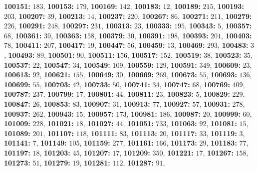 \textsf{\bfseries 100151:} $183$, \textsf{\bfseries 100153:} $179$, \textsf{\bfseries 100169:} $142$, \textsf{\bfseries 100183:} $12$, \textsf{\bfseries 100189:} $215$, \textsf{\bfseries 100193:} $203$, \textsf{\bfseries 100207:} $39$, \textsf{\bfseries 100213:} $14$, \textsf{\bfseries 100237:} $220$, \textsf{\bfseries 100267:} $86$, \textsf{\bfseries 100271:} $211$, \textsf{\bfseries 100279:} $226$, \textsf{\bfseries 100291:} $248$, \textsf{\bfseries 100297:} $231$, \textsf{\bfseries 100313:} $23$, \textsf{\bfseries 100333:} $195$, \textsf{\bfseries 100343:} $5$, \textsf{\bfseries 100357:} $68$, \textsf{\bfseries 100361:} $39$, \textsf{\bfseries 100363:} $158$, \textsf{\bfseries 100379:} $30$, \textsf{\bfseries 100391:} $198$, \textsf{\bfseries 100393:} $201$, \textsf{\bfseries 100403:} $78$, \textsf{\bfseries 100411:} $207$, \textsf{\bfseries 100417:} $19$, \textsf{\bfseries 100447:} $56$, \textsf{\bfseries 100459:} $13$, \textsf{\bfseries 100469:} $293$, \textsf{\bfseries 100483:} $3$, \textsf{\bfseries 100493:} $89$, \textsf{\bfseries 100501:} $90$, \textsf{\bfseries 100511:} $156$, \textsf{\bfseries 100517:} $152$, \textsf{\bfseries 100519:} $38$, \textsf{\bfseries 100523:} $35$, \textsf{\bfseries 100537:} $22$, \textsf{\bfseries 100547:} $34$, \textsf{\bfseries 100549:} $109$, \textsf{\bfseries 100559:} $129$, \textsf{\bfseries 100591:} $349$, \textsf{\bfseries 100609:} $23$, \textsf{\bfseries 100613:} $92$, \textsf{\bfseries 100621:} $155$, \textsf{\bfseries 100649:} $30$, \textsf{\bfseries 100669:} $269$, \textsf{\bfseries 100673:} $55$, \textsf{\bfseries 100693:} $136$, \textsf{\bfseries 100699:} $55$, \textsf{\bfseries 100703:} $42$, \textsf{\bfseries 100733:} $50$, \textsf{\bfseries 100741:} $34$, \textsf{\bfseries 100747:} $68$, \textsf{\bfseries 100769:} $409$, \textsf{\bfseries 100787:} $237$, \textsf{\bfseries 100799:} $17$, \textsf{\bfseries 100801:} $44$, \textsf{\bfseries 100811:} $23$, \textsf{\bfseries 100823:} $5$, \textsf{\bfseries 100829:} $229$, \textsf{\bfseries 100847:} $26$, \textsf{\bfseries 100853:} $83$, \textsf{\bfseries 100907:} $31$, \textsf{\bfseries 100913:} $77$, \textsf{\bfseries 100927:} $57$, \textsf{\bfseries 100931:} $278$, \textsf{\bfseries 100937:} $262$, \textsf{\bfseries 100943:} $15$, \textsf{\bfseries 100957:} $173$, \textsf{\bfseries 100981:} $186$, \textsf{\bfseries 100987:} $20$, \textsf{\bfseries 100999:} $60$, \textsf{\bfseries 101009:} $228$, \textsf{\bfseries 101021:} $18$, \textsf{\bfseries 101027:} $44$, \textsf{\bfseries 101051:} $733$, \textsf{\bfseries 101063:} $92$, \textsf{\bfseries 101081:} $15$, \textsf{\bfseries 101089:} $201$, \textsf{\bfseries 101107:} $118$, \textsf{\bfseries 101111:} $83$, \textsf{\bfseries 101113:} $20$, \textsf{\bfseries 101117:} $33$, \textsf{\bfseries 101119:} $3$, \textsf{\bfseries 101141:} $7$, \textsf{\bfseries 101149:} $105$, \textsf{\bfseries 101159:} $277$, \textsf{\bfseries 101161:} $166$, \textsf{\bfseries 101173:} $29$, \textsf{\bfseries 101183:} $77$, \textsf{\bfseries 101197:} $18$, \textsf{\bfseries 101203:} $45$, \textsf{\bfseries 101207:} $17$, \textsf{\bfseries 101209:} $350$, \textsf{\bfseries 101221:} $17$, \textsf{\bfseries 101267:} $158$, \textsf{\bfseries 101273:} $51$, \textsf{\bfseries 101279:} $19$, \textsf{\bfseries 101281:} $112$, \textsf{\bfseries 101287:} $91$, 

